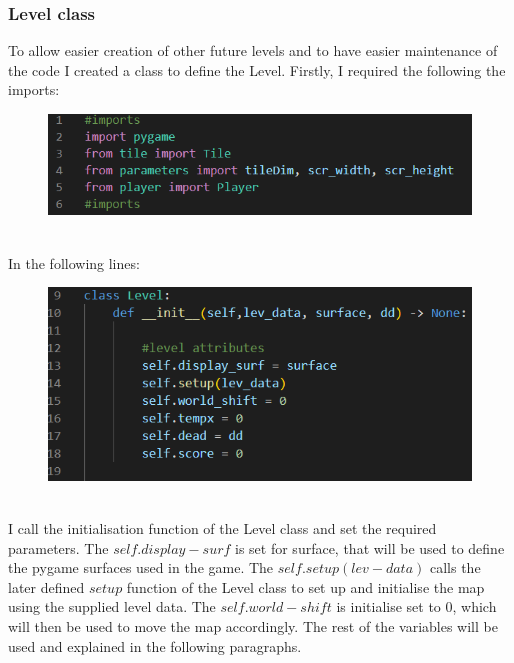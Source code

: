 \documentclass[12pt]{article}
\begin{document}
\subsubsection{Level class}
To allow easier creation of other future levels and to have easier maintenance of the code I created a class to define the Level. Firstly, I required the following the imports:\\
\begin{figure}[H]
    \includegraphics[width = 12cm]{Level class/loneimp.png}
    \centering
\end{figure}\\

In the following lines:\\
\begin{figure}[H]
    \includegraphics[width = 12cm]{Level class/loneinit.png}
    \centering
\end{figure}\\
I call the initialisation function of the Level class and set the required parameters. The $self.display-surf$ is set for surface, that will be used to define the pygame surfaces used in the game. The $self.setup(lev-data)$ calls the later defined $setup$ function of the Level class to set up and initialise the map using the supplied level data. The $self.world-shift$ is initialise set to 0, which will then be used to move the map accordingly. The rest of the variables will be used and explained in the following paragraphs.\\
\end{document}
